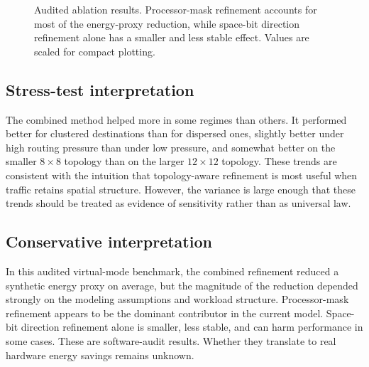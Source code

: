 \documentclass[11pt]{article}
\begin{document}
\begin{figure}[t]
\centering
{}
\caption{Audited ablation results. Processor-mask refinement accounts for most of the energy-proxy reduction, while space-bit direction refinement alone has a smaller and less stable effect. Values are scaled for compact plotting.}
\label{fig:audit-bars}
\end{figure}

\subsection{Stress-test interpretation}
The combined method helped more in some regimes than others. It performed better for clustered destinations than for dispersed ones, slightly better under high routing pressure than under low pressure, and somewhat better on the smaller $8\times 8$ topology than on the larger $12\times 12$ topology. These trends are consistent with the intuition that topology-aware refinement is most useful when traffic retains spatial structure. However, the variance is large enough that these trends should be treated as evidence of sensitivity rather than as universal law.

\subsection{Conservative interpretation}
In this audited virtual-mode benchmark, the combined refinement reduced a synthetic energy proxy on average, but the magnitude of the reduction depended strongly on the modeling assumptions and workload structure. Processor-mask refinement appears to be the dominant contributor in the current model. Space-bit direction refinement alone is smaller, less stable, and can harm performance in some cases. These are software-audit results. Whether they translate to real hardware energy savings remains unknown.
\end{document}
